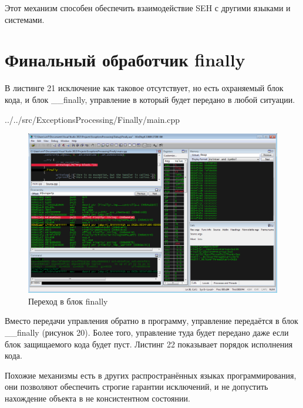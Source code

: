 \documentclass[a4paper, 12pt]{report}		%
\begin{document}
Этот механизм способен обеспечить взаимодействие SEH с другими языками и системами.

\chapter*{Финальный обработчик finally}

В листинге 21 исключение как таковое отсутствует, но есть охраняемый блок кода, и блок \_\_finally, управление в который будет передано в любой ситуации\cite{Dushutina}.


{../../src/ExceptionsProcessing/Finally/main.cpp}

\begin{figure}[h!]
\centering
\includegraphics[scale=0.50]{res/013}
\caption{Переход в блок finally}
\end{figure}



Вместо передачи управления обратно в программу, управление передаётся в блок \_\_finally (рисунок 20). Более того, управление туда будет передано даже если блок защищаемого кода будет пуст. Листинг 22 показывает порядок исполнения кода.

Похожие механизмы есть в других распространённых языках программирования, они позволяют обеспечить строгие гарантии исключений, и не допустить нахождение объекта в не консистентном состоянии.
\newpage
\end{document}
